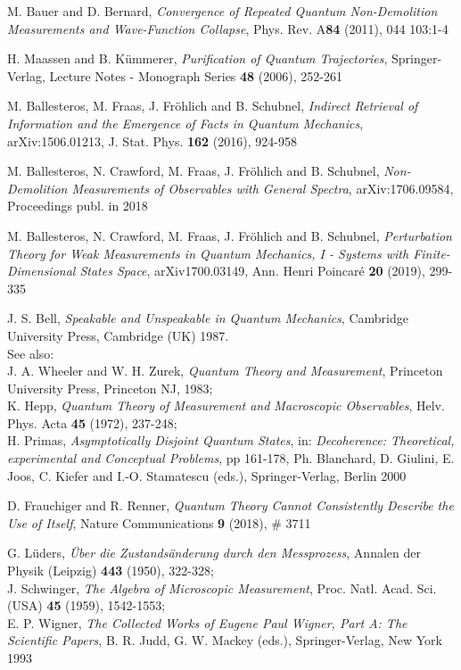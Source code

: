\documentclass[a4paper,11pt]{article}
\begin{document}
\begin{thebibliography}{References}
 M. Bauer and D. Bernard, \textit{Convergence of Repeated Quantum Non-Demolition Measurements and Wave-Function Collapse}, Phys. Rev. A{\bf{84}} (2011), 044 103:1-4

 H. Maassen and B. K\"{u}mmerer, \textit{Purification of Quantum Trajectories}, Springer-Verlag, Lecture Notes - Monograph Series {\bf{48}} (2006), 252-261 

 M. Ballesteros, M. Fraas, J. Fr\"{o}hlich and B. Schubnel, \textit{Indirect Retrieval of Information and the Emergence of Facts in Quantum Mechanics}, arXiv:1506.01213, J. Stat. Phys. {\bf{162}} (2016), 924-958 

 M. Ballesteros, N. Crawford, M. Fraas, J. Fr\"{o}hlich and B. Schubnel, \textit{Non-Demolition Measurements of Observables with General Spectra}, arXiv:1706.09584, Proceedings publ. in 2018

 M. Ballesteros, N. Crawford, M. Fraas, J. Fr\"{o}hlich and B. Schubnel, \textit{Perturbation Theory for Weak Measurements in Quantum Mechanics, I - Systems with Finite-Dimensional States Space}, arXiv1700.03149, Ann. Henri Poincar\'e {\bf{20}} (2019), 299-335 

 J. S. Bell, \textit{Speakable and Unspeakable in Quantum Mechanics}, Cambridge University Press, Cambridge (UK) 1987.\\
See also:\\
J. A. Wheeler and W. H. Zurek, \textit{Quantum Theory and Measurement}, Princeton University Press, Princeton NJ, 1983;\\
K. Hepp, \textit{Quantum Theory of Measurement and Macroscopic Observables}, Helv. Phys. Acta {\bf{45}} (1972), 237-248;\\
H. Primas, \textit{Asymptotically Disjoint Quantum States}, in: \textit{Decoherence: Theoretical, experimental and Conceptual Problems}, pp 161-178, Ph. Blanchard, D. Giulini, E. Joos, C. Kiefer and I.-O. Stamatescu (eds.), Springer-Verlag, Berlin 2000

 D. Frauchiger and R. Renner, \textit{Quantum Theory Cannot Consistently Describe the Use of Itself}, Nature Communications {\bf{9}} (2018), \# 3711 

 G. L\"{u}ders, \textit{\"{U}ber die Zustands\"{a}nderung durch den Messprozess}, Annalen der Physik (Leipzig) {\bf{443}} (1950), 322-328;\\
J. Schwinger, \textit{The Algebra of Microscopic Measurement}, Proc. Natl. Acad. Sci. (USA) {\bf{45}} (1959), 1542-1553;\\
E. P. Wigner, \textit{The Collected Works of Eugene Paul Wigner, Part A: The Scientific Papers}, B. R. Judd, G. W. Mackey (eds.), Springer-Verlag, New York 1993


\end{thebibliography}
\end{document}
